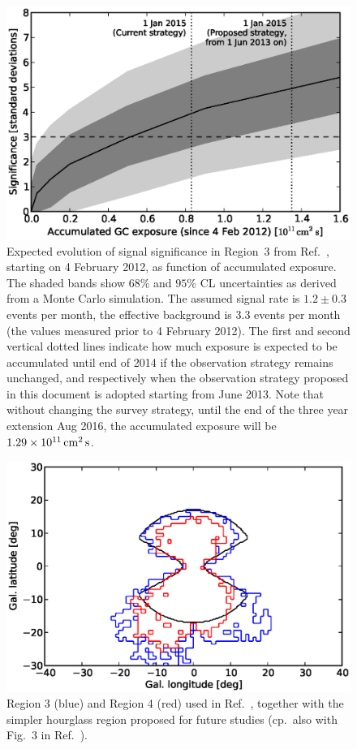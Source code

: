 \documentclass[aps,prd,superscriptaddress,nofootinbib,fixlfloat, 12pt]{revtex4-1}
\begin{document}
\begin{figure}[h]
  \begin{center}
    \includegraphics[width=0.6\linewidth]{plots/projection.eps}
    \vspace{-0.5cm}
  \end{center}
  \caption{
    Expected evolution of signal significance in Region~3 from
    Ref.~\cite{Weniger:2012}, starting on 4
    February 2012, as function of
    accumulated exposure.  The shaded bands show $68\%$ and $95\%$ CL
    uncertainties as derived from a Monte Carlo simulation.  The assumed
    signal rate is $1.2\pm 0.3$ events per month, the effective background is
    $3.3$ events per month (the values measured prior to 4 February 2012).
    The first and second vertical dotted lines indicate how much exposure is
    expected to be accumulated until end of 2014 if the observation strategy remains
    unchanged, and respectively when the observation strategy proposed in this
    document is adopted starting from June 2013. Note that without changing
    the survey strategy, until the end of the three year extension Aug 2016,
    the accumulated exposure will be $1.29\times10^{11}\rm\,cm^2\,s$.}
  \label{fig:projection}
\end{figure}

\begin{figure}[h]
  \begin{center}
    \includegraphics[width=0.6\linewidth]{plots/regions.eps}
    \vspace{-0.5cm}
  \end{center}
  \caption{Region 3 (blue) and Region 4 (red) used in
  Ref.~\cite{Weniger:2012}, together with the simpler hourglass region
  proposed for future studies (cp.~also with Fig.~3 in
  Ref.~\cite{Bringmann:2012ez}).}
  \label{fig:regions}
\end{figure}
\end{document}
